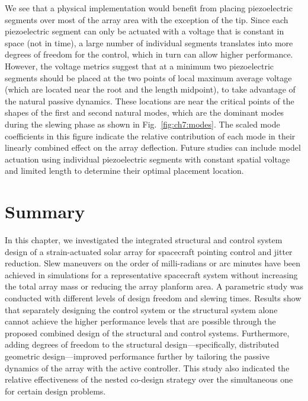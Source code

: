 We see that a physical implementation would benefit from placing piezoelectric segments over most of the array area with the exception of the tip. Since each piezoelectric segment can only be actuated with a voltage that is constant in space (not in time), a large number of individual segments translates into more degrees of freedom for the control, which in turn can allow higher performance. However, the voltage metrics suggest that at a minimum two piezoelectric segments should be placed at the two points of local maximum average voltage (which are located near the root and the length midpoint), to take advantage of the natural passive dynamics. These locations are near the critical points of the shapes of the first and second natural modes, which are the dominant modes during the slewing phase as shown in Fig.~\ref{fig:ch7:modes}. The scaled mode coefficients in this figure indicate the relative contribution of each mode in their linearly combined effect on the array deflection. Future studies can include model actuation using individual piezoelectric segments with constant spatial voltage and limited length to determine their optimal placement location. 

\section{Summary\label{sec:ch7:conclusions}}

In this chapter, we investigated the integrated structural and control system design of a strain-actuated solar array for spacecraft pointing control and jitter reduction. Slew maneuvers on the order of milli-radians or arc minutes have been achieved in simulations for a representative spacecraft system without increasing the total array mass or reducing the array planform area. A parametric study was conducted with different levels of design freedom and slewing times. Results show that separately designing the control system or the structural system alone cannot achieve the higher performance levels that are possible through the proposed combined design of the structural and control systems. Furthermore, adding degrees of freedom to the structural design---specifically, distributed geometric design---improved performance further by tailoring the passive dynamics of the array with the active controller.
This study also indicated the relative effectiveness of the nested co-design strategy over the simultaneous one for certain design problems.

